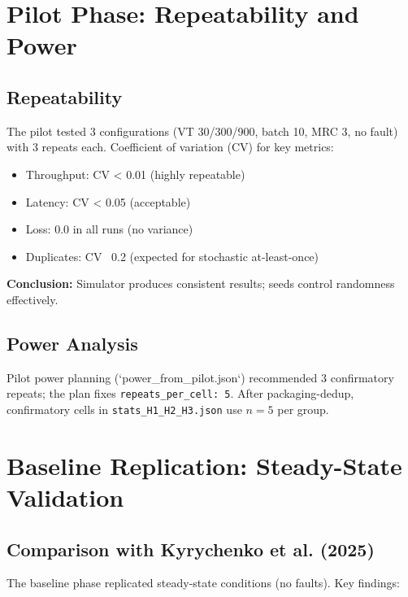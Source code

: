 \section{Pilot Phase: Repeatability and Power}

\subsection{Repeatability}

The pilot tested 3 configurations (VT 30/300/900, batch 10, MRC 3, no fault) with 3 repeats each. Coefficient of variation (CV) for key metrics:
\begin{itemize}
    \item Throughput: CV < 0.01 (highly repeatable)
    \item Latency: CV < 0.05 (acceptable)
    \item Loss: 0.0 in all runs (no variance)
    \item Duplicates: CV ~0.2 (expected for stochastic at-least-once)
\end{itemize}

\textbf{Conclusion:} Simulator produces consistent results; seeds control randomness effectively.

\subsection{Power Analysis}

Pilot power planning (`power_from_pilot.json`) recommended 3 confirmatory repeats; the plan fixes \texttt{repeats\_per\_cell: 5}. After packaging-dedup, confirmatory cells in \texttt{stats\_H1\_H2\_H3.json} use $n=5$ per group.

\section{Baseline Replication: Steady-State Validation}

\subsection{Comparison with Kyrychenko et al. (2025)}

The baseline phase replicated \citet{Kyrychenko2025} steady-state conditions (no faults). Key findings:


